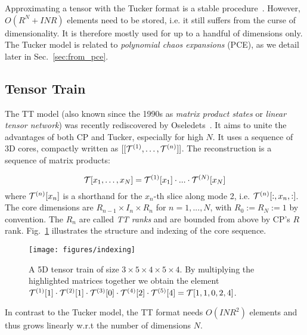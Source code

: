 \documentclass[review, twocolumn]{svjour3}          %
\begin{document}
Approximating a tensor with the Tucker format is a stable procedure~\cite{LMV:00b}. However, $O(R^N + I N R)$ elements need to be stored, i.e. it still suffers from the curse of dimensionality. It is therefore mostly used for up to a handful of dimensions only. The Tucker model is related to \emph{polynomial chaos expansions} (PCE), as we detail later in Sec.~\ref{sec:from_pce}.

\subsection{Tensor Train}

The TT model (also known since the 1990s as \emph{matrix product states} or \emph{linear tensor network}) was recently rediscovered by Oseledets~\cite{Oseledets:11}. It aims to unite the advantages of both CP and Tucker, especially for high $N$. It uses a sequence of 3D cores, compactly written as $[[\mathcal{T}^{(1)},\dots,\mathcal{T}^{(n)}]]$. The reconstruction is a sequence of matrix products:

\begin{equation}
\mathcal{T}[x_1,\dots,x_N] = \mathcal{T}^{(1)}[x_1] \cdot ... \cdot \mathcal{T}^{(N)}[x_N]
\end{equation}
%
where $\mathcal{T}^{(n)}[x_n]$ is a shorthand for the $x_n$-th slice along mode 2, i.e. $\mathcal{T}^{(n)}[:, x_n, :]$. The core dimensions are $R_{n-1} \times I_n \times R_n$ for $n = 1, ..., N$, with $R_0 := R_N := 1$ by convention. The $R_n$ are called \emph{TT ranks} and are bounded from above by CP's $R$ rank. Fig.~\ref{fig:tt} illustrates the structure and indexing of the core sequence.

\begin{figure}[ht]\centering 
  \texttt{[image: figures/indexing]}
  \caption{A 5D tensor train of size $3 \times 5 \times 4 \times 5 \times 4$. By multiplying the highlighted matrices together we obtain the element $\mathcal{T}^{(1)}[1] \cdot \mathcal{T}^{(2)}[1] \cdot \mathcal{T}^{(3)}[0] \cdot \mathcal{T}^{(4)}[2] \cdot \mathcal{T}^{(5)}[4] = \mathcal{T}[1, 1, 0, 2, 4]$.}
  \label{fig:tt}
\end{figure}

In contrast to the Tucker model, the TT format needs $O(I N R^2)$ elements and thus grows linearly w.r.t the number of dimensions $N$.

\end{document}
